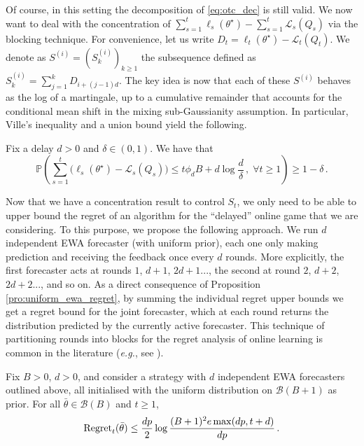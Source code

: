 Of course, in this setting the decomposition of \eqref{eq:otc_dec} is still valid. We now want to deal with the concentration of $\sum_{s=1}^t\ell_s(\theta^{\star}) - \sum_{s=1}^{t}\mathcal{L}_s(Q_s)$ via the blocking technique. For convenience, let us write $D_t = \ell_t(\theta^\star) - \mathcal L_t(Q_t)$. We denote as $S^{(i)} = (S_k^{(i)})_{k\geq 1}$ the subsequence defined as $S_k^{(i)} = \sum_{j=1}^k D_{i+(j-1)d}$. The key idea is now that each of these $S^{(i)}$ behaves as the log of a martingale, up to a cumulative remainder that accounts for the conditional mean shift in the mixing sub-Gaussianity assumption. In particular, Ville's inequality and a union bound yield the following. 

\begin{lemma}\label{lemma:conc}
	Fix a delay $d>0$ and $\delta\in(0,1)$. We have that
	$$\mathbb P\left(\sum_{s=1}^t\big(\ell_s(\theta^{\star}) - \mathcal{L}_s(Q_s)\big) \leq t\phi_d B + d\log\frac{d}{\delta}\,,\;\forall t\geq 1\right)\geq 1-\delta\,.$$
\end{lemma}

Now that we have a concentration result to control $S_t$, we only need to be able to upper bound the regret of an algorithm for the ``delayed'' online game that we are considering. To this purpose, we propose the following approach. We run $d$ independent EWA forecaster (with uniform prior), each one only making prediction and receiving the feedback once every $d$ rounds. More explicitly, the first forecaster acts at rounds $1$, $d+1$, $2d+1$..., the second at round $2$, $d+2$, $2d+2$..., and so on. As a direct consequence of Proposition \ref{pro:uniform_ewa_regret}, by summing the individual regret upper bounds we get a regret bound for the joint forecaster, which at each round returns the distribution predicted by the currently active forecaster. This technique of partitioning rounds into blocks for the regret analysis of online learning is common in the literature (\emph{e.g.}, see \citealp{weiberger2002delay}).

\begin{lemma}\label{lemma:reg}
Fix $B>0$, $d>0$, and consider a strategy with $d$ independent EWA forecasters outlined above, all initialised with the uniform distribution on $\mathcal B(B+1)$ as prior. For all $\bar{\theta}\in\mathcal B(B)$ and $t\geq 1$,
\begin{equation*}
\mathrm{Regret}_t(\bar{\theta}) \leq \frac{dp}{2}\log\frac{(B+1)^2e\max(dp,t+d)}{dp}\,.
\end{equation*}
\end{lemma}

